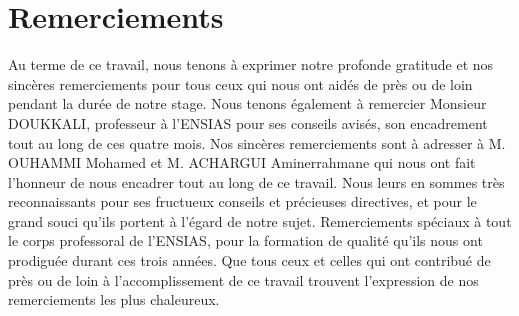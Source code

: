 \chapter*{Remerciements}
\begin{onehalfspace}
Au terme de ce travail, nous tenons à exprimer notre profonde gratitude et nos sincères remerciements pour tous ceux qui nous ont aidés de près ou de loin pendant la durée de notre stage.
\newline
\newline
Nous tenons également à remercier Monsieur DOUKKALI, professeur à l’ENSIAS pour ses conseils avisés, son encadrement tout au long de ces quatre mois. Nos sincères remerciements sont à adresser à M. OUHAMMI Mohamed et M. ACHARGUI Aminerrahmane qui nous ont fait l'honneur de nous encadrer tout au long de ce travail. Nous leurs en sommes très reconnaissants pour ses fructueux conseils et précieuses directives, et pour le grand souci qu’ils portent à l’égard de notre sujet. 
\newline
\newline
Remerciements spéciaux à tout le corps professoral de l’ENSIAS, pour la formation de qualité qu’ils nous ont prodiguée durant ces trois années. Que tous ceux et celles qui ont contribué de près ou de loin à l’accomplissement de ce travail trouvent l’expression de nos remerciements les plus chaleureux.
\end{onehalfspace}